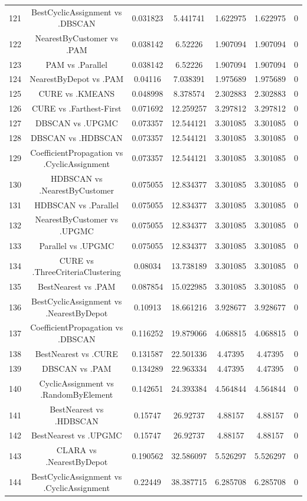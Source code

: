 \documentclass[a4paper,10pt]{article}
\begin{document}
\begin{landscape}
\begin{table}[!htp]
\begin{tabular}{ccccccc}
121&BestCyclicAssignment vs .DBSCAN&0.031823&5.441741&1.622975&1.622975&0\\
122&NearestByCustomer vs .PAM&0.038142&6.52226&1.907094&1.907094&0\\
123&PAM vs .Parallel&0.038142&6.52226&1.907094&1.907094&0\\
124&NearestByDepot vs .PAM&0.04116&7.038391&1.975689&1.975689&0\\
125&CURE vs .KMEANS&0.048998&8.378574&2.302883&2.302883&0\\
126&CURE vs .Farthest-First&0.071692&12.259257&3.297812&3.297812&0\\
127&DBSCAN vs .UPGMC&0.073357&12.544121&3.301085&3.301085&0\\
128&DBSCAN vs .HDBSCAN&0.073357&12.544121&3.301085&3.301085&0\\
129&CoefficientPropagation vs .CyclicAssignment&0.073357&12.544121&3.301085&3.301085&0\\
130&HDBSCAN vs .NearestByCustomer&0.075055&12.834377&3.301085&3.301085&0\\
131&HDBSCAN vs .Parallel&0.075055&12.834377&3.301085&3.301085&0\\
132&NearestByCustomer vs .UPGMC&0.075055&12.834377&3.301085&3.301085&0\\
133&Parallel vs .UPGMC&0.075055&12.834377&3.301085&3.301085&0\\
134&CURE vs .ThreeCriteriaClustering&0.08034&13.738189&3.301085&3.301085&0\\
135&BestNearest vs .PAM&0.087854&15.022985&3.301085&3.301085&0\\
136&BestCyclicAssignment vs .NearestByDepot&0.10913&18.661216&3.928677&3.928677&0\\
137&CoefficientPropagation vs .DBSCAN&0.116252&19.879066&4.068815&4.068815&0\\
138&BestNearest vs .CURE&0.131587&22.501336&4.47395&4.47395&0\\
139&DBSCAN vs .PAM&0.134289&22.963334&4.47395&4.47395&0\\
140&CyclicAssignment vs .RandomByElement&0.142651&24.393384&4.564844&4.564844&0\\
141&BestNearest vs .HDBSCAN&0.15747&26.92737&4.88157&4.88157&0\\
142&BestNearest vs .UPGMC&0.15747&26.92737&4.88157&4.88157&0\\
143&CLARA vs .NearestByDepot&0.190562&32.586097&5.526297&5.526297&0\\
144&BestCyclicAssignment vs .CyclicAssignment&0.22449&38.387715&6.285708&6.285708&0\\

\end{tabular}
\end{table}
\end{landscape}
\end{document}
